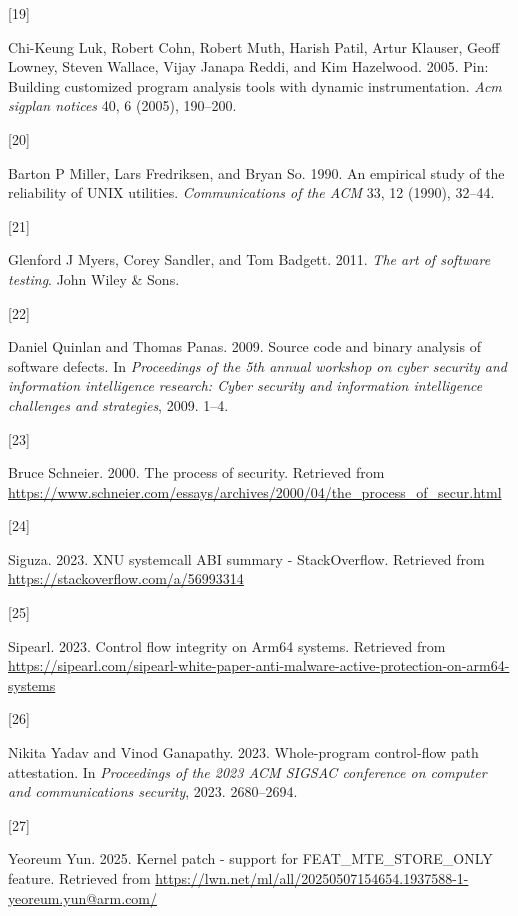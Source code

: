 \documentclass[a4paper, nobind]{templates/ociamthesis}
\newlength{\cslhangindent}
\newlength{\csllabelwidth}
\newenvironment{CSLReferences}[2] %
{\begin{list}{}{%
	\setlength{\itemindent}{0pt}
	\setlength{\leftmargin}{0pt}
	\setlength{\parsep}{0pt}
	\ifodd #1
	\setlength{\leftmargin}{\cslhangindent}
	\setlength{\itemindent}{-1\cslhangindent}
	\fi
	\setlength{\itemsep}{#2\baselineskip}}}
{\end{list}}
\newcommand{\CSLLeftMargin}[1]{\parbox[t]{\csllabelwidth}{\strut#1\strut}}
\newcommand{\CSLRightInline}[1]{\parbox[t]{\linewidth - \csllabelwidth}{\strut#1\strut}}
\begin{document}
\begin{CSLReferences}{0}{0}
\CSLLeftMargin{{[}19{]} }%
\CSLRightInline{Chi-Keung Luk, Robert Cohn, Robert Muth, Harish Patil, Artur Klauser, Geoff Lowney, Steven Wallace, Vijay Janapa Reddi, and Kim Hazelwood. 2005. Pin: Building customized program analysis tools with dynamic instrumentation. \emph{Acm sigplan notices} 40, 6 (2005), 190--200.}

\CSLLeftMargin{{[}20{]} }%
\CSLRightInline{Barton P Miller, Lars Fredriksen, and Bryan So. 1990. An empirical study of the reliability of UNIX utilities. \emph{Communications of the ACM} 33, 12 (1990), 32--44.}

\CSLLeftMargin{{[}21{]} }%
\CSLRightInline{Glenford J Myers, Corey Sandler, and Tom Badgett. 2011. \emph{The art of software testing}. John Wiley \& Sons.}

\CSLLeftMargin{{[}22{]} }%
\CSLRightInline{Daniel Quinlan and Thomas Panas. 2009. Source code and binary analysis of software defects. In \emph{Proceedings of the 5th annual workshop on cyber security and information intelligence research: Cyber security and information intelligence challenges and strategies}, 2009. 1--4.}

\CSLLeftMargin{{[}23{]} }%
\CSLRightInline{Bruce Schneier. 2000. The process of security. Retrieved from \url{https://www.schneier.com/essays/archives/2000/04/the_process_of_secur.html}}

\CSLLeftMargin{{[}24{]} }%
\CSLRightInline{Siguza. 2023. XNU systemcall ABI summary - StackOverflow. Retrieved from \url{https://stackoverflow.com/a/56993314}}

\CSLLeftMargin{{[}25{]} }%
\CSLRightInline{Sipearl. 2023. Control flow integrity on Arm64 systems. Retrieved from \url{https://sipearl.com/sipearl-white-paper-anti-malware-active-protection-on-arm64-systems}}

\CSLLeftMargin{{[}26{]} }%
\CSLRightInline{Nikita Yadav and Vinod Ganapathy. 2023. Whole-program control-flow path attestation. In \emph{Proceedings of the 2023 ACM SIGSAC conference on computer and communications security}, 2023. 2680--2694.}

\CSLLeftMargin{{[}27{]} }%
\CSLRightInline{Yeoreum Yun. 2025. Kernel patch - support for FEAT\_MTE\_STORE\_ONLY feature. Retrieved from \url{https://lwn.net/ml/all/20250507154654.1937588-1-yeoreum.yun@arm.com/}}

\end{CSLReferences}

\end{document}
